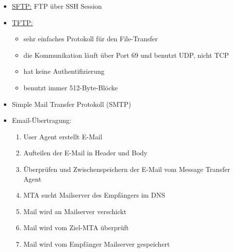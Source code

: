 \begin{itemize}
    \item \underline{SFTP:} FTP über SSH Session
    \item \underline{TFTP:}
    \begin{itemize}
        \item sehr einfaches Protokoll für den File-Transfer
        \item die Kommunikation läuft über Port 69 und benutzt UDP, nicht TCP
        \item hat keine Authentifizierung
        \item benutzt immer 512-Byte-Blöcke
    \end{itemize}
\end{itemize}

\begin{itemize}
    \item Simple Mail Transfer Protokoll (SMTP)
    \item Email-Übertragung:
    \begin{enumerate}
        \item User Agent erstellt E-Mail
        \item Aufteilen der E-Mail in Header und Body
        \item Überprüfen und Zwischenspeichern der E-Mail vom Message Transfer Agent
        \item MTA sucht Mailserver des Empfängers im DNS
        \item Mail wird an Mailserver verschickt
        \item Mail wird vom Ziel-MTA überprüft
        \item Mail wird vom Empfänger Mailserver gespeichert
    \end{enumerate}
\end{itemize}

